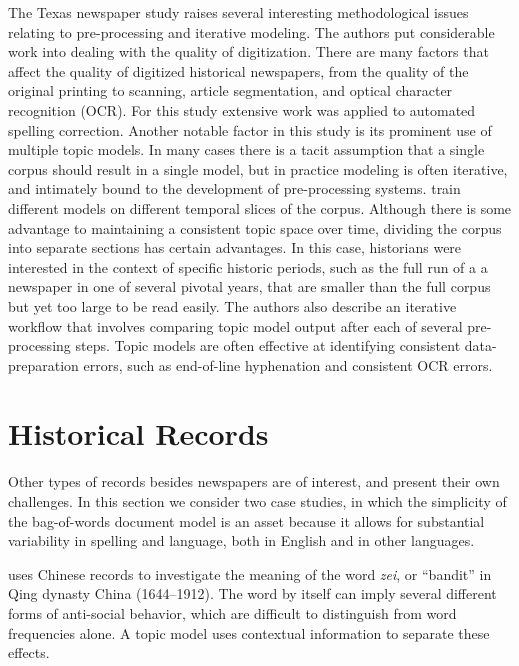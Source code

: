 The Texas newspaper study raises several interesting methodological issues relating to pre-processing and iterative modeling.
The authors put considerable work into dealing with the quality of digitization.
There are many factors that affect the quality of digitized historical newspapers, from the quality of the original printing to scanning, article segmentation, and optical character recognition (OCR).
For this study extensive work was applied to automated spelling correction.
Another notable factor in this study is its prominent use of multiple topic models.
In many cases there is a tacit assumption that a single corpus should result in a single model, but in practice modeling is often iterative, and intimately bound to the development of pre-processing systems.
\cite{yang-11-historical} train different models on different temporal slices of the corpus.
Although there is some advantage to maintaining a consistent topic space over time, dividing the corpus into separate sections has certain advantages.
In this case, historians were interested in the context of specific historic periods, such as the full run of a a newspaper in one of several pivotal years, that are smaller than the full corpus but yet too large to be read easily.
The authors also describe an iterative workflow that involves comparing topic model output after each of several pre-processing steps.
Topic models are often effective at identifying consistent data-preparation errors, such as end-of-line hyphenation and consistent OCR errors.

\section{Historical Records}

Other types of records besides newspapers are of interest, and present their own challenges.
In this section we consider two case studies, in which the simplicity of the bag-of-words document model is an asset because it allows for substantial variability in spelling and language, both in English and in other languages.

\cite{miller-13} uses Chinese records to investigate the meaning of
the word {\em zei}, or ``bandit'' in Qing dynasty China (1644--1912). The word by
itself can imply several different forms of anti-social behavior,
which are difficult to distinguish from word frequencies alone. A
topic model uses contextual information to separate these effects.

